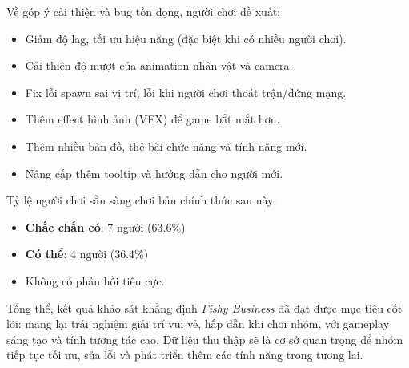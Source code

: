 Về góp ý cải thiện và bug tồn đọng, người chơi đề xuất:
\begin{itemize}
    \item Giảm độ lag, tối ưu hiệu năng (đặc biệt khi có nhiều người chơi).
    \item Cải thiện độ mượt của animation nhân vật và camera.
    \item Fix lỗi spawn sai vị trí, lỗi khi người chơi thoát trận/đứng mạng.
    \item Thêm effect hình ảnh (VFX) để game bắt mắt hơn.
    \item Thêm nhiều bản đồ, thẻ bài chức năng và tính năng mới.
    \item Nâng cấp thêm tooltip và hướng dẫn cho người mới.
\end{itemize}

Tỷ lệ người chơi sẵn sàng chơi bản chính thức sau này:
\begin{itemize}
    \item \textbf{Chắc chắn có}: 7 người (63.6\%)
    \item \textbf{Có thể}: 4 người (36.4\%)
    \item Không có phản hồi tiêu cực.
\end{itemize}

Tổng thể, kết quả khảo sát khẳng định \textit{Fishy Business} đã đạt được mục tiêu cốt lõi: mang lại trải nghiệm giải trí vui vẻ, hấp dẫn khi chơi nhóm, với gameplay sáng tạo và tính tương tác cao. Dữ liệu thu thập sẽ là cơ sở quan trọng để nhóm tiếp tục tối ưu, sửa lỗi và phát triển thêm các tính năng trong tương lai.
